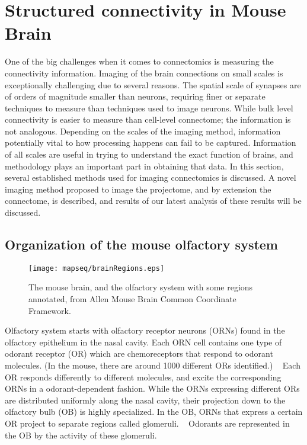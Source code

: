 \documentclass[../dissertation.tex]{subfiles}
\begin{document}
\myChapterCover{}

\section{Structured connectivity in Mouse Brain}
\label{sec:mapseq}

One of the big challenges when it comes to connectomics is measuring the connectivity information.
Imaging of the brain connections on small scales is exceptionally challenging due to several reasons.
The spatial scale of synapses are of orders of magnitude smaller than neurons, requiring finer or separate techniques to measure than techniques used to image neurons.
While bulk level connectivity is easier to measure than cell-level connectome; the information is not analogous.
Depending on the scales of the imaging method, information potentially vital to how processing happens can fail to be captured.
Information of all scales are useful in trying to understand the exact function of brains, and methodology plays an important part in obtaining that data.
In this section, several established methods used for imaging connectomics is discussed.
A novel imaging method proposed to image the projectome, and by extension the connectome, is described,
and results of our latest analysis of these results will be discussed.

\subsection{Organization of the mouse olfactory system}

\begin{figure}[ht]
    \centering
    \texttt{[image: mapseq/brainRegions.eps]}
    \caption{The mouse brain, and the olfactory system with some regions annotated, from Allen Mouse Brain Common Coordinate Framework.~\cite{allenAtlas}}
    \label{fig:mouse-brain}
\end{figure}

Olfactory system starts with olfactory receptor neurons (ORNs) found in the olfactory epithelium in the nasal cavity.
Each ORN cell contains one type of odorant receptor (OR) which are chemoreceptors that respond to odorant molecules.
(In the mouse, there are around 1000 different ORs identified.)
~\cite{obneuron-mice}
Each OR responds differently to different molecules, and excite the corresponding ORNs in a odorant-dependent fashion.
While the ORNs expressing different ORs are distributed uniformly along the nasal cavity, their projection down to the olfactory bulb (OB) is highly specialized.
In the OB, ORNs that express a certain OR project to separate regions called glomeruli.
~\cite{mapseq007,mapseq008,mapseq009}
Odorants are represented in the OB by the activity of these glomeruli.
\end{document}
